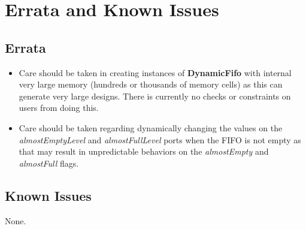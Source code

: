\section{Errata and Known Issues}

\subsection{Errata}
\begin{itemize}
      \item{
            Care should be taken in creating instances of \textbf{DynamicFifo}
            with internal very large memory (hundreds or thousands of memory
            cells) as this can generate very large designs. There is currently
            no checks or constraints on users from doing this.
            }

      \item{
            Care should be taken regarding dynamically changing the values on
            the \textit{almostEmptyLevel} and \textit{almostFullLevel} ports
            when the FIFO is not empty as that may result in unpredictable
            behaviors on the \textit{almostEmpty} and \textit{almostFull} flags.
            }
\end{itemize}

\subsection{Known Issues}
None.
